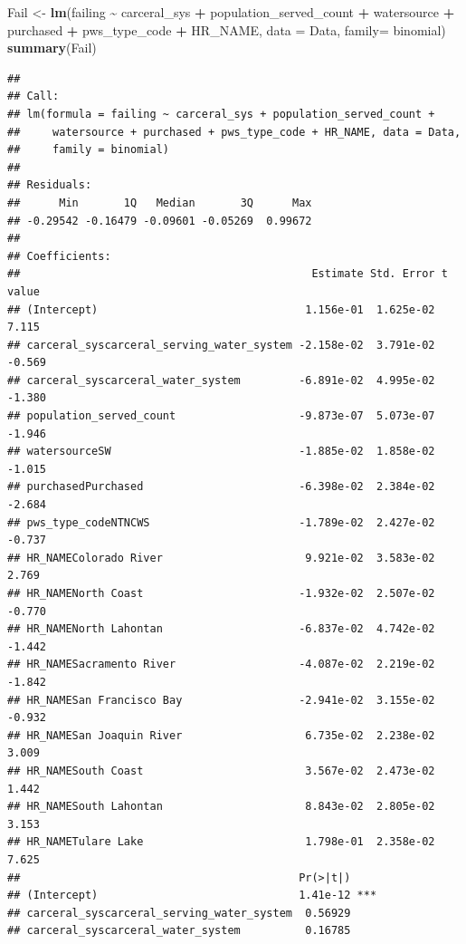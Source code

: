 \documentclass[
]{article}
\newenvironment{Shaded}{\begin{snugshade}}{\end{snugshade}}
\newcommand{\AttributeTok}[1]{\textcolor[rgb]{0.13,0.29,0.53}{#1}}
\newcommand{\FunctionTok}[1]{\textcolor[rgb]{0.13,0.29,0.53}{\textbf{#1}}}
\newcommand{\NormalTok}[1]{#1}
\newcommand{\OtherTok}[1]{\textcolor[rgb]{0.56,0.35,0.01}{#1}}
\newcommand{\SpecialCharTok}[1]{\textcolor[rgb]{0.81,0.36,0.00}{\textbf{#1}}}
\begin{document}
\begin{Shaded}
\begin{Highlighting}[]
\NormalTok{Fail }\OtherTok{\textless{}{-}} \FunctionTok{lm}\NormalTok{(failing }\SpecialCharTok{\textasciitilde{}}\NormalTok{ carceral\_sys }\SpecialCharTok{+}\NormalTok{ population\_served\_count }\SpecialCharTok{+}\NormalTok{ watersource }\SpecialCharTok{+}\NormalTok{ purchased }\SpecialCharTok{+}\NormalTok{ pws\_type\_code }\SpecialCharTok{+}\NormalTok{ HR\_NAME, }\AttributeTok{data =}\NormalTok{ Data, }\AttributeTok{family=}\NormalTok{ binomial)}
\FunctionTok{summary}\NormalTok{(Fail)}
\end{Highlighting}
\end{Shaded}

\begin{verbatim}
## 
## Call:
## lm(formula = failing ~ carceral_sys + population_served_count + 
##     watersource + purchased + pws_type_code + HR_NAME, data = Data, 
##     family = binomial)
## 
## Residuals:
##      Min       1Q   Median       3Q      Max 
## -0.29542 -0.16479 -0.09601 -0.05269  0.99672 
## 
## Coefficients:
##                                             Estimate Std. Error t value
## (Intercept)                                1.156e-01  1.625e-02   7.115
## carceral_syscarceral_serving_water_system -2.158e-02  3.791e-02  -0.569
## carceral_syscarceral_water_system         -6.891e-02  4.995e-02  -1.380
## population_served_count                   -9.873e-07  5.073e-07  -1.946
## watersourceSW                             -1.885e-02  1.858e-02  -1.015
## purchasedPurchased                        -6.398e-02  2.384e-02  -2.684
## pws_type_codeNTNCWS                       -1.789e-02  2.427e-02  -0.737
## HR_NAMEColorado River                      9.921e-02  3.583e-02   2.769
## HR_NAMENorth Coast                        -1.932e-02  2.507e-02  -0.770
## HR_NAMENorth Lahontan                     -6.837e-02  4.742e-02  -1.442
## HR_NAMESacramento River                   -4.087e-02  2.219e-02  -1.842
## HR_NAMESan Francisco Bay                  -2.941e-02  3.155e-02  -0.932
## HR_NAMESan Joaquin River                   6.735e-02  2.238e-02   3.009
## HR_NAMESouth Coast                         3.567e-02  2.473e-02   1.442
## HR_NAMESouth Lahontan                      8.843e-02  2.805e-02   3.153
## HR_NAMETulare Lake                         1.798e-01  2.358e-02   7.625
##                                           Pr(>|t|)    
## (Intercept)                               1.41e-12 ***
## carceral_syscarceral_serving_water_system  0.56929    
## carceral_syscarceral_water_system          0.16785    

\end{verbatim}
\end{document}
